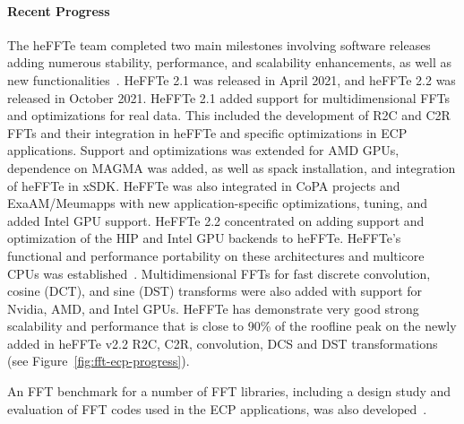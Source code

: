 \paragraph{Recent Progress}
The heFFTe team completed two main milestones involving software releases adding 
numerous stability, performance, and scalability enhancements, as well as new 
functionalities~\cite{heffte-pact21}. 
HeFFTe 2.1 was released in April 2021, and heFFTe 2.2 was released in October 
2021. HeFFTe 2.1 added support for multidimensional FFTs and optimizations for real data.
This included the development of R2C and C2R FFTs and their integration in heFFTe and 
specific optimizations in ECP applications. Support and optimizations was extended for AMD 
GPUs, dependence on MAGMA was added, as well as spack installation, and integration of heFFTe in xSDK.
HeFFTe was also integrated in CoPA projects and ExaAM/Meumapps with new application-specific 
optimizations, tuning, and added Intel GPU support. 
HeFFTe 2.2 concentrated on adding support and optimization of the HIP and Intel GPU backends to 
heFFTe. HeFFTe's functional and performance portability on these architectures and
multicore CPUs was established~\cite{hpec21}.
Multidimensional FFTs for 
fast discrete convolution, cosine (DCT), and sine (DST) transforms were also added with support 
for Nvidia, AMD, 
and Intel GPUs. HeFFTe has demonstrate very good strong scalability and performance that is 
close to 90\% of the roofline peak on the newly added in heFFTe v2.2 R2C, C2R, convolution,
DCS and DST transformations~\cite{heffte-pact21,heffte-iccs20} (see Figure~\ref{fig:fft-ecp-progress}). 

An FFT benchmark for a number of FFT libraries, including a design study and evaluation of FFT 
codes used in the ECP applications, was also developed~\cite{fftbenchmark}.

